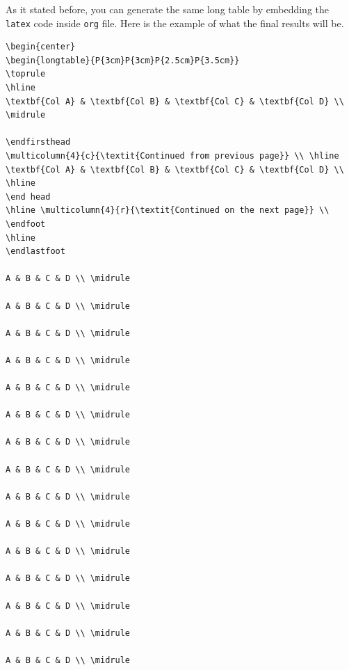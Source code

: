 \documentclass[12pt]{report}
\numberwithin{equation}{section}
\theoremstyle{definition}
\theoremstyle{remark}
\theoremstyle{example}
\theoremstyle{axiom}
\begin{document}
\begin{appendix}
As it stated before, you can generate the same long table by embedding the
\texttt{latex} code inside \texttt{org} file. Here is the example of what the final results
will be.

\begin{verbatim}
\begin{center}
\begin{longtable}{P{3cm}P{3cm}P{2.5cm}P{3.5cm}}
\toprule
\hline
\textbf{Col A} & \textbf{Col B} & \textbf{Col C} & \textbf{Col D} \\ \midrule

\endfirsthead
\multicolumn{4}{c}{\textit{Continued from previous page}} \\ \hline
\textbf{Col A} & \textbf{Col B} & \textbf{Col C} & \textbf{Col D} \\ \hline
\end head
\hline \multicolumn{4}{r}{\textit{Continued on the next page}} \\
\endfoot
\hline
\endlastfoot

A & B & C & D \\ \midrule

A & B & C & D \\ \midrule

A & B & C & D \\ \midrule

A & B & C & D \\ \midrule

A & B & C & D \\ \midrule

A & B & C & D \\ \midrule

A & B & C & D \\ \midrule

A & B & C & D \\ \midrule

A & B & C & D \\ \midrule

A & B & C & D \\ \midrule

A & B & C & D \\ \midrule

A & B & C & D \\ \midrule

A & B & C & D \\ \midrule

A & B & C & D \\ \midrule

A & B & C & D \\ \midrule


\end{verbatim}
\end{appendix}
\end{document}
